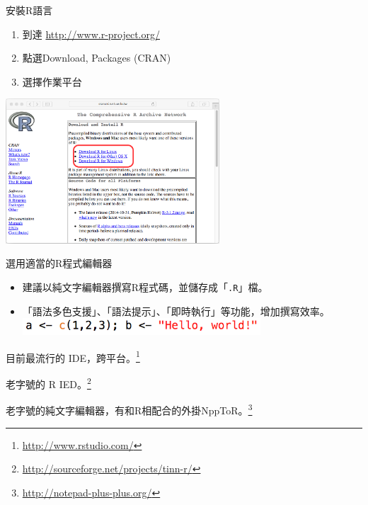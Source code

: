 \documentclass[14pt, aspectratio=43]{beamer}
\let\oldfootnote\footnote
\renewcommand\footnote[1]{\hspace{-0.7em}\oldfootnote{\ignorespaces#1}\hspace{0.5em}}
\begin{document}
\begin{frame}[fragile]{安裝R語言}
\begin{enumerate}
\item 到達 \url{http://www.r-project.org/}
\item 點選Download, Packages (CRAN) \\
\item 選擇作業平台
\end{enumerate}
  \begin{center}\includegraphics[width=0.6\textwidth]{downloadR.png}\end{center}
\end{frame}

\begin{frame}[fragile]{選用適當的R程式編輯器}


\begin{itemize}
\item 建議以純文字編輯器撰寫R程式碼，並儲存成「\verb+.R+」檔。\\
\item 「語法多色支援」、「語法提示」、「即時執行」等功能，增加撰寫效率。\\ \includegraphics[width=0.7\textwidth]{editor.png}
\end{itemize}
\begin{description}
	\item [\href{http://www.rstudio.com/}{RStudio}] 目前最流行的 IDE，跨平台。\footnote{\url{http://www.rstudio.com/}}
	\item [\href{http://sourceforge.net/projects/tinn-r/}{Tinn-R}] 老字號的 R IED。\footnote{\url{http://sourceforge.net/projects/tinn-r/}}
	\item [\href{http://notepad-plus-plus.org/}{Notepad++}] 老字號的純文字編輯器，有和R相配合的外掛NppToR。\footnote{\url{http://notepad-plus-plus.org/}}
\end{description}
\end{frame}
\end{document}
